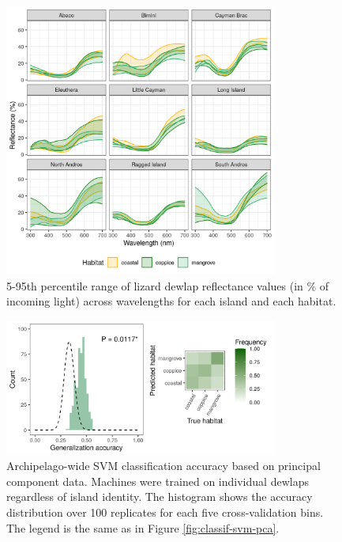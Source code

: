 \begin{figure}[H]
	\centering
	\includegraphics[width=0.8\textwidth]{suppfigures/figure_reflectance.png}
	\caption{5-95th percentile range of lizard dewlap reflectance values (in \% of incoming light) across wavelengths for each island and each habitat.}
	\label{supfig:reflectance}
\end{figure}

\begin{figure}[H]
	\centering
	\includegraphics[width=0.8\textwidth]{suppfigures/classif_svm_pca_pooled.png}
	\caption{Archipelago-wide SVM classification accuracy based on principal component data. Machines were trained on individual dewlaps regardless of island identity. The histogram shows the accuracy distribution over 100 replicates for each five cross-validation bins. The legend is the same as in Figure \ref{fig:classif-svm-pca}.}
	\label{supfig:classif-svm-pca-pooled}
\end{figure}

